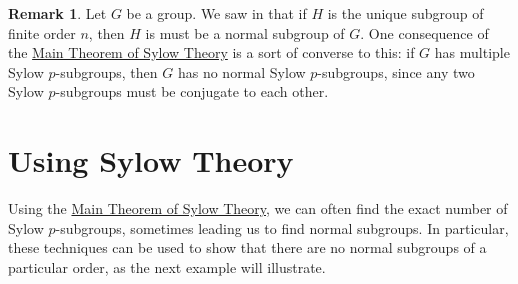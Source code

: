 \documentclass[12pt]{report}
\numberwithin{equation}{section}
\numberwithin{theorem}{chapter}
\theoremstyle{definition}
\newtheorem*{basic properties}{Basic Properties}
\newtheorem*{Important Remark}{Important Remark}
\newtheorem{remark}[theorem]{Remark}
\begin{document}
\begin{remark}
Let $G$ be a group. We saw in  that if $H$ is the unique subgroup of finite order $n$, then $H$ is must be a normal subgroup of $G$. 
One consequence of the \hyperref[Sylow]{Main Theorem of Sylow Theory} is a sort of converse to this: if $G$ has multiple Sylow $p$-subgroups, then $G$ has no normal Sylow $p$-subgroups, since any two Sylow $p$-subgroups must be conjugate to each other.
\end{remark}



\section{Using Sylow Theory}


Using the \hyperref[Sylow]{Main Theorem of Sylow Theory}, we can often find the exact number of Sylow $p$-subgroups, sometimes leading us to find normal subgroups. In particular, these techniques can be used to show that there are no normal subgroups of a particular order, as the next example will illustrate.
\end{document}
